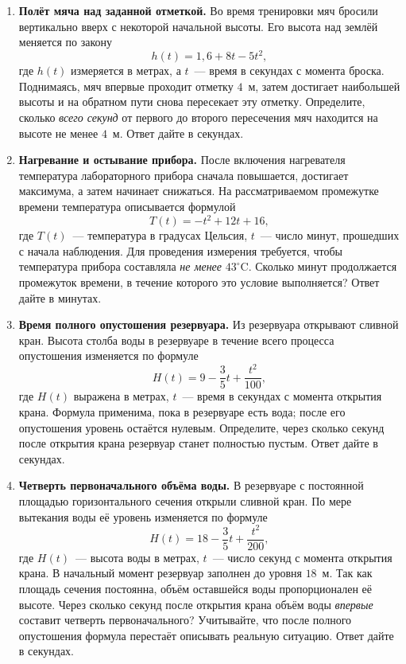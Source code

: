 \documentclass[a4paper,11pt]{article}
\begin{document}
\begin{enumerate}[label=\textbf{\arabic*.},leftmargin=1.0cm,itemsep=9pt]
\item \textbf{Полёт мяча над заданной отметкой.} Во время тренировки мяч бросили вертикально вверх с некоторой начальной высоты. Его высота над землёй меняется по закону
\[
 h(t)=1{,}6+8t-5t^2,
\]
где $h(t)$ измеряется в метрах, а $t$~--- время в секундах с момента броска. Поднимаясь, мяч впервые проходит отметку $4$~м, затем достигает наибольшей высоты и на обратном пути снова пересекает эту отметку. Определите, сколько \emph{всего секунд} от первого до второго пересечения мяч находится на высоте не менее $4$~м. Ответ дайте в секундах.

\clearpage
\item \textbf{Нагревание и остывание прибора.} После включения нагревателя температура лабораторного прибора сначала повышается, достигает максимума, а затем начинает снижаться. На рассматриваемом промежутке времени температура описывается формулой
\[
 T(t)=-t^2+12t+16,
\]
где $T(t)$~--- температура в градусах Цельсия, $t$~--- число минут, прошедших с начала наблюдения. Для проведения измерения требуется, чтобы температура прибора составляла \emph{не менее} $43^\circ\mathrm C$. Сколько минут продолжается промежуток времени, в течение которого это условие выполняется? Ответ дайте в минутах.
\item \textbf{Время полного опустошения резервуара.} Из резервуара открывают сливной кран. Высота столба воды в резервуаре в течение всего процесса опустошения изменяется по формуле
\[
 H(t)=9-\frac35t+\frac{t^2}{100},
\]
где $H(t)$ выражена в метрах, $t$~--- время в секундах с момента открытия крана. Формула применима, пока в резервуаре есть вода; после его опустошения уровень остаётся нулевым. Определите, через сколько секунд после открытия крана резервуар станет полностью пустым. Ответ дайте в секундах.

\item \textbf{Четверть первоначального объёма воды.} В резервуаре с постоянной площадью горизонтального сечения открыли сливной кран. По мере вытекания воды её уровень изменяется по формуле
\[
 H(t)=18-\frac35t+\frac{t^2}{200},
\]
где $H(t)$~--- высота воды в метрах, $t$~--- число секунд с момента открытия крана. В начальный момент резервуар заполнен до уровня $18$~м. Так как площадь сечения постоянна, объём оставшейся воды пропорционален её высоте. Через сколько секунд после открытия крана объём воды \emph{впервые} составит четверть первоначального? Учитывайте, что после полного опустошения формула перестаёт описывать реальную ситуацию. Ответ дайте в секундах.


\end{enumerate}
\end{document}
